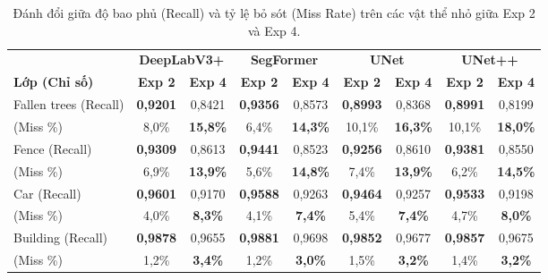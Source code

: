 \begin{table}[H]
\centering
\caption{Đánh đổi giữa độ bao phủ (Recall) và tỷ lệ bỏ sót (Miss Rate) trên các vật thể nhỏ giữa Exp 2 và Exp 4.}
\label{tab:small_object_tradeoff}
\small
\begin{tabular}{l c c c c c c c c}
\toprule
 & \multicolumn{2}{c}{\textbf{DeepLabV3+}} & \multicolumn{2}{c}{\textbf{SegFormer}} & \multicolumn{2}{c}{\textbf{UNet}} & \multicolumn{2}{c}{\textbf{UNet++}} \\
\cmidrule(lr){2-3} \cmidrule(lr){4-5} \cmidrule(lr){6-7} \cmidrule(lr){8-9}
\textbf{Lớp (Chỉ số)} & \textbf{Exp 2} & \textbf{Exp 4} & \textbf{Exp 2} & \textbf{Exp 4} & \textbf{Exp 2} & \textbf{Exp 4} & \textbf{Exp 2} & \textbf{Exp 4} \\
\midrule
Fallen trees       (Recall) & \textbf{0,9201} & 0,8421 & \textbf{0,9356} & 0,8573 & \textbf{0,8993} & 0,8368 & \textbf{0,8991} & 0,8199 \\
                    (Miss \%) & 8,0\% & \textbf{15,8\%} & 6,4\% & \textbf{14,3\%} & 10,1\% & \textbf{16,3\%} & 10,1\% & \textbf{18,0\%} \\
\hline
Fence              (Recall) & \textbf{0,9309} & 0,8613 & \textbf{0,9441} & 0,8523 & \textbf{0,9256} & 0,8610 & \textbf{0,9381} & 0,8550 \\
                    (Miss \%) & 6,9\% & \textbf{13,9\%} & 5,6\% & \textbf{14,8\%} & 7,4\% & \textbf{13,9\%} & 6,2\% & \textbf{14,5\%} \\
\hline
Car                (Recall) & \textbf{0,9601} & 0,9170 & \textbf{0,9588} & 0,9263 & \textbf{0,9464} & 0,9257 & \textbf{0,9533} & 0,9198 \\
                    (Miss \%) & 4,0\% & \textbf{8,3\%} & 4,1\% & \textbf{7,4\%} & 5,4\% & \textbf{7,4\%} & 4,7\% & \textbf{8,0\%} \\
\hline
Building           (Recall) & \textbf{0,9878} & 0,9655 & \textbf{0,9881} & 0,9698 & \textbf{0,9852} & 0,9677 & \textbf{0,9857} & 0,9675 \\
                    (Miss \%) & 1,2\% & \textbf{3,4\%} & 1,2\% & \textbf{3,0\%} & 1,5\% & \textbf{3,2\%} & 1,4\% & \textbf{3,2\%} \\
\bottomrule
\end{tabular}
\end{table}

